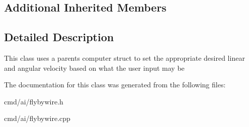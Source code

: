 \subsection*{Additional Inherited Members}


\subsection{Detailed Description}
This class uses a parent\textquotesingle{}s computer struct to set the appropriate desired linear and angular velocity based on what the user input may be 

The documentation for this class was generated from the following files\+:\begin{DoxyCompactItemize}
\item 
cmd/ai/flybywire.\+h\item 
cmd/ai/flybywire.\+cpp\end{DoxyCompactItemize}
